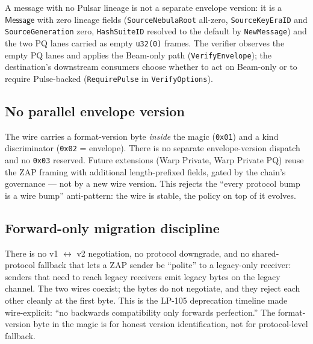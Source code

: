 A message with no Pulsar lineage is not a separate envelope version: it is a $\mathsf{Message}$ with zero lineage fields (\texttt{SourceNebulaRoot} all-zero, \texttt{SourceKeyEraID} and \texttt{SourceGeneration} zero, \texttt{HashSuiteID} resolved to the default by \texttt{NewMessage}) and the two PQ lanes carried as empty \texttt{u32(0)} frames. The verifier observes the empty PQ lanes and applies the Beam-only path (\texttt{VerifyEnvelope}); the destination's downstream consumers choose whether to act on Beam-only or to require Pulse-backed (\texttt{RequirePulse} in \texttt{VerifyOptions}).

\subsection{No parallel envelope version}

The wire carries a format-version byte \emph{inside} the magic (\texttt{0x01}) and a kind discriminator (\texttt{0x02} = envelope). There is no separate envelope-version dispatch and no \texttt{0x03} reserved. Future extensions (Warp Private, Warp Private PQ) reuse the ZAP framing with additional length-prefixed fields, gated by the chain's governance --- not by a new wire version. This rejects the ``every protocol bump is a wire bump'' anti-pattern: the wire is stable, the policy on top of it evolves.

\subsection{Forward-only migration discipline}

There is no v1 $\leftrightarrow$ v2 negotiation, no protocol downgrade, and no shared-protocol fallback that lets a ZAP sender be ``polite'' to a legacy-only receiver: senders that need to reach legacy receivers emit legacy bytes on the legacy channel. The two wires coexist; the bytes do not negotiate, and they reject each other cleanly at the first byte. This is the LP-105 \cite{lp105} deprecation timeline made wire-explicit: ``no backwards compatibility only forwards perfection.'' The format-version byte in the magic is for honest version identification, not for protocol-level fallback.
